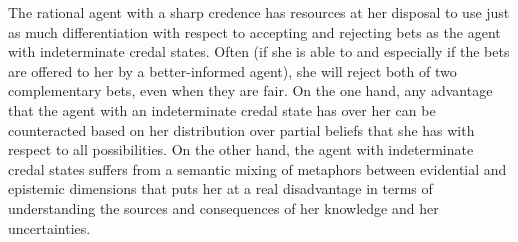 The rational agent with a sharp credence has resources
at her disposal to use just as much differentiation
with respect to accepting and rejecting bets as the
agent with indeterminate credal states. Often (if she
is able to and especially if the bets are offered to
her by a better-informed agent), she will reject both
of two complementary bets, even when they are fair. On
the one hand, any advantage that the agent with an
indeterminate credal state has over her can be
counteracted based on her distribution over partial
beliefs that she has with respect to all possibilities.
On the other hand, the agent with indeterminate credal
states suffers from a semantic mixing of metaphors
between evidential and epistemic dimensions that puts
her at a real disadvantage in terms of understanding
the sources and consequences of her knowledge and her
uncertainties.
